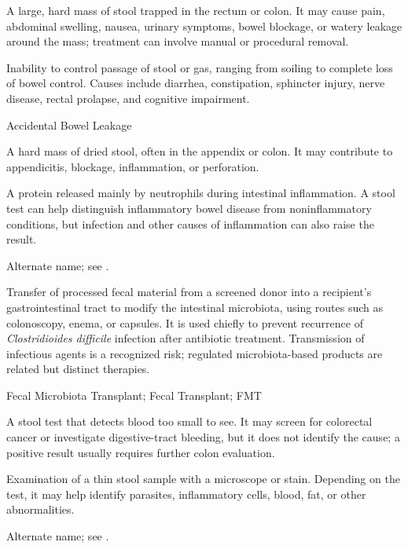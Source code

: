  A large, hard mass of stool trapped in the rectum or colon. It may cause pain, abdominal swelling, nausea, urinary symptoms, bowel blockage, or watery leakage around the mass; treatment can involve manual or procedural removal.

 Inability to control passage of stool or gas, ranging from soiling to complete loss of bowel control. Causes include diarrhea, constipation, sphincter injury, nerve disease, rectal prolapse, and cognitive impairment.


\synonyms
Accidental Bowel Leakage

 A hard mass of dried stool, often in the appendix or colon. It may contribute to appendicitis, blockage, inflammation, or perforation.

 A protein released mainly by neutrophils during intestinal inflammation. A stool test can help distinguish inflammatory bowel disease from noninflammatory conditions, but infection and other causes of inflammation can also raise the result.

 Alternate name; see .

 Transfer of processed fecal material from a screened donor into a recipient’s gastrointestinal tract to modify the intestinal microbiota, using routes such as colonoscopy, enema, or capsules.
It is used chiefly to prevent recurrence of \textit{Clostridioides difficile}
infection after antibiotic treatment. Transmission of infectious agents is a
recognized risk; regulated microbiota-based products are related but distinct therapies.

\synonyms
Fecal Microbiota Transplant; Fecal Transplant; FMT

 A stool test that detects blood too small to see. It may screen for colorectal cancer or investigate digestive-tract bleeding, but it does not identify the cause; a positive result usually requires further colon evaluation.

 Examination of a thin stool sample with a microscope or stain. Depending on the test, it may help identify parasites, inflammatory cells, blood, fat, or other abnormalities.

 Alternate name; see .

